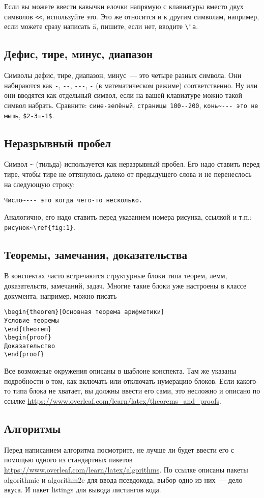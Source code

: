 \documentclass{article}
\begin{document}
    Если вы можете ввести кавычки елочки напрямую с клавиатуры вместо двух символов \verb|<<|, используйте это.
    Это же относится и к другим символам, например, если можете сразу написать ä, пишите, если нет, вводите \verb|\"a|.

    \subsection{Дефис, тире, минус, диапазон}

    Символы дефис, тире, диапазон, минус~--- это четыре разных символа. Они набираются как
    \verb|-|, \verb|--|, \verb|---|, \verb|-| (в математическом режиме) соответственно.
    Ну или они вводятся как отдельный символ, если на вашей клавиатуре можно такой символ
    набрать. Сравните: \verb|сине-зелёный|, \verb|страницы 100--200|,
    \verb|конь~--- это не мышь|, \verb|$2-3=-1$|.

    \subsection{Неразрывный пробел}

    Символ \verb|~| (тильда) используется как неразрывный пробел.
    Его надо ставить перед тире, чтобы тире не оттянулось далеко от предыдущего слова и не перенеслось на следующую строку:
    \begin{verbatim}Число~--- это когда чего-то несколько.
    \end{verbatim}
    Аналогично, его надо ставить перед указанием номера рисунка, ссылкой и т.п.: \verb|рисунок~\ref{fig:1}|.

    \subsection{Теоремы, замечания, доказательства}

    В конспектах часто встречаются структурные блоки типа теорем, лемм, доказательств, замечаний, задач.
    Многие такие блоки уже настроены в классе документа, например, можно писать
    \begin{verbatim}
\begin{theorem}[Основная теорема арифметики]
Условие теоремы
\end{theorem}
\begin{proof}
Доказательство
\end{proof}
    \end{verbatim}
    Все возможные окружения описаны в шаблоне конспекта.
    Там же указаны подробности о том, как включать или отключать нумерацию блоков.
    Если какого-то типа блока не хватает, вы должны ввести его сами, это несложно и описано по ссылке \url{https://www.overleaf.com/learn/latex/theorems_and_proofs}.

    \subsection{Алгоритмы}
    Перед написанием алгоритма посмотрите, не лучше ли будет ввести его с помощью одного из стандартных пакетов
    \url{https://www.overleaf.com/learn/latex/algorithms}. По ссылке описаны пакеты algorithmic и algorithm2e для
    ввода псевдокода, выбор одно из них~--- дело вкуса. И пакет listings для вывода листингов кода.
\end{document}
